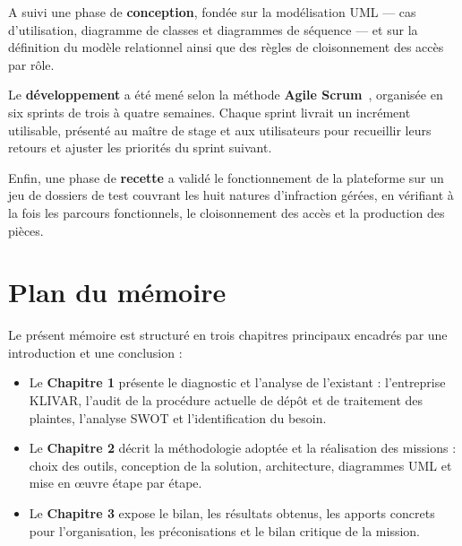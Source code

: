 A suivi une phase de \textbf{conception}, fondée sur la modélisation UML — cas d'utilisation, diagramme de classes et diagrammes de séquence — et sur la définition du modèle relationnel ainsi que des règles de cloisonnement des accès par rôle.

Le \textbf{développement} a été mené selon la méthode \textbf{Agile Scrum}~\cite{agile:manifesto}, organisée en six sprints de trois à quatre semaines. Chaque sprint livrait un incrément utilisable, présenté au maître de stage et aux utilisateurs pour recueillir leurs retours et ajuster les priorités du sprint suivant.

Enfin, une phase de \textbf{recette} a validé le fonctionnement de la plateforme sur un jeu de dossiers de test couvrant les huit natures d'infraction gérées, en vérifiant à la fois les parcours fonctionnels, le cloisonnement des accès et la production des pièces.

\section*{Plan du mémoire}

Le présent mémoire est structuré en trois chapitres principaux encadrés par une introduction et une conclusion :

\begin{itemize}
    \item Le \textbf{Chapitre 1} présente le diagnostic et l'analyse de l'existant : l'entreprise KLIVAR, l'audit de la procédure actuelle de dépôt et de traitement des plaintes, l'analyse SWOT et l'identification du besoin.
    \item Le \textbf{Chapitre 2} décrit la méthodologie adoptée et la réalisation des missions : choix des outils, conception de la solution, architecture, diagrammes UML et mise en œuvre étape par étape.
    \item Le \textbf{Chapitre 3} expose le bilan, les résultats obtenus, les apports concrets pour l'organisation, les préconisations et le bilan critique de la mission.
\end{itemize}

